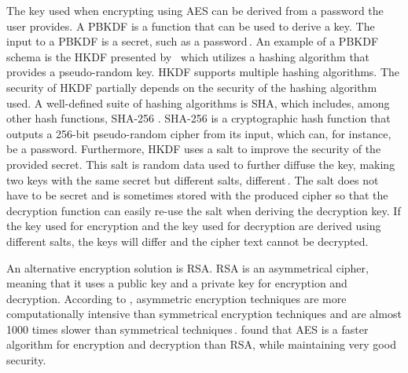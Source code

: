 The key used when encrypting using \gls{AES} can be derived from a password the user provides. A \gls{PBKDF} is a function that can be used to derive a key. The input to a \gls{PBKDF} is a secret, such as a password\,\cite{kodwaniSecurityKeyDerivation2021}. An example of a \gls{PBKDF} schema is the \gls{HKDF} presented by \citeauthor{krawczykCryptographicExtractionKey2010}\,\cite{krawczykCryptographicExtractionKey2010, krawczykHMACbasedExtractandExpandKey2010} which utilizes a hashing algorithm that provides a \mbox{pseudo-random} key. \gls{HKDF} supports multiple hashing algorithms. The security of \gls{HKDF} partially depends on the security of the hashing algorithm used. A \mbox{well-defined} suite of hashing algorithms is \gls{SHA}, which includes, among other hash functions, \mbox{\gls{SHA}-256} \cite{hansenUSSecureHash2011}. \mbox{\gls{SHA}-256} is a cryptographic hash function that outputs a \mbox{256-bit} \mbox{pseudo-random} cipher from its input, which can, for instance, be a password. Furthermore, \gls{HKDF} uses a salt to improve the security of the provided secret. This salt is random data used to further diffuse the key, making two keys with the same secret but different salts, different\,\cite{ariasAddingSaltHashing2021}. The salt does not have to be secret and is sometimes stored with the produced cipher so that the decryption function can easily \mbox{re-use} the salt when deriving the decryption key. If the key used for encryption and the key used for decryption are derived using different salts, the keys will differ and the cipher text cannot be decrypted.

An alternative encryption solution is \gls{RSA}. \gls{RSA} is an asymmetrical cipher, meaning that it uses a public key and a private key for encryption and decryption. According to \citeauthor{mahajanStudyEncryptionAlgorithms2013}, asymmetric encryption techniques are more computationally intensive than symmetrical encryption techniques and are almost \num{1000} times slower than symmetrical techniques\,\cite{mahajanStudyEncryptionAlgorithms2013}. \citeauthor{mahajanStudyEncryptionAlgorithms2013} found that \gls{AES} is a faster algorithm for encryption and decryption than \gls{RSA}, while maintaining very good security.